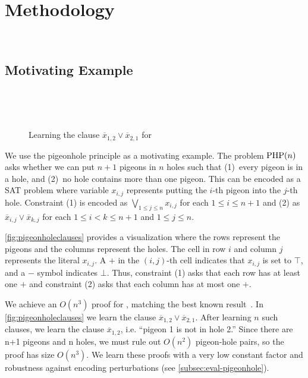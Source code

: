 \section{Methodology}~\label{sec:method}

\subsection{Motivating Example}~\label{sec:motivatex}

\begin{figure*}[!t]
    \centering
    
    \caption{Learning the clause $\overline{x}_{1, 2} \lor \overline{x}_{2, 1}$
    for }~\label{fig:pigeonholeclauses}
  \end{figure*}

We use the pigeonhole principle as a motivating example. The problem $\mathrm{PHP}(n)$
asks whether we can put $n+1$ pigeons in $n$ holes such that (1)~every pigeon is
in a hole, and (2)~no hole contains more than one pigeon. This can be encoded as
a SAT problem where variable $x_{i, j}$ represents putting the $i$-th pigeon
into the $j$-th hole. Constraint (1) is encoded as $\bigvee_{1 \leq j \leq n}
x_{i, j}$ for each $1 \leq i \leq n+1$ and (2) as $\overline{x}_{i, j} \lor
\overline{x}_{k, j}$ for each $ 1 \leq i < k \leq n+1$ and $1 \leq j \leq n$.

\autoref{fig:pigeonholeclauses} provides a visualization where the rows
represent the pigeons and the columns represent the holes. The cell in row $i$
and column $j$ represents the literal $x_{i, j}$.
A $+$ in the $(i, j)$-th cell indicates that $x_{i, j}$ is set to $\top$, and a
$-$ symbol indicates $\bot$. Thus, constraint (1) asks that each row has at
least one $+$ and constraint (2) asks that each column has at most one $+$.

We achieve an $O(n^3)$ \pr proof for , matching the best known
result~\cite{prclauses}. In \autoref{fig:pigeonholeclauses} we learn the clause
$\overline{x}_{1, 2} \lor \overline{x}_{2, 1}$. After learning $n$ such clauses,
we learn the clause $\overline{x}_{1, 2}$, i.e. “pigeon 1 is not in hole 2.”
Since there are n+1 pigeons and n holes, we must rule out $O(n^2)$ pigeon-hole
pairs, so the proof has size $O(n^3)$. We learn these proofs with a very low
constant factor and robustness against encoding perturbations (see
\autoref{subsec:eval-pigeonhole}).

